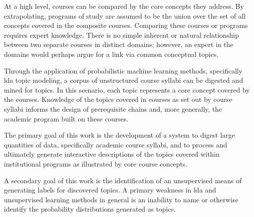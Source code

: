 At a high level, courses can be compared by the core concepts they address.
By extrapolating, programs of study are assumed to be the union over the set
of all concepts covered in the composite courses. Comparing these courses
or programs requires expert knowledge. There is no simple inherent or
natural relationship between two separate courses in distinct domains;
however, an expert in the domains would perhaps argue for a link via common
conceptual topics.

Through the application of  probabilistic machine learning methods,
specifically \ac{lda} topic modeling, a corpus of unstructured course
syllabi can be digested and mined for topics. In this scenario, each topic
represents a core concept covered by the courses. Knowledge of the topics
covered in courses as set out by course syllabi informs the design of
prerequisite chains and, more generally, the academic program built on
these courses.

The primary goal of this work is the development of a system to digest
large quantities of data, specifically academic course syllabi, and to
process and ultimately generate interactive descriptions of the topics
covered within institutional programs as illustrated by core course
concepts.

A secondary goal of this work is the identification of an unsupervised
means of generating labels for discovered topics. A primary weakness in
\ac{lda} and unsupervised learning methods in general is an inability to
name or otherwise identify the probability distributions generated as
topics.

